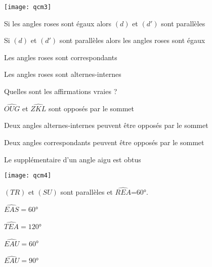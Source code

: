 \begin{QCM}

\begin{GroupeQCM}

\begin{exercice}
\begin{center}
    \texttt{[image: qcm3]}
\end{center}
\begin{ChoixQCM}{4}
\item Si les angles roses sont égaux alors $(d)$ et $(d')$ sont parallèles
\item Si $(d)$ et $(d')$ sont parallèles alors les angles roses sont égaux
\item Les angles roses sont correspondants
\item Les angles roses sont alternes-internes
\end{ChoixQCM}
\begin{corrige}
\end{corrige}
\end{exercice}



\begin{exercice}
Quelles sont les affirmations vraies ?
\begin{ChoixQCM}{4}
\item $\widehat{OUG}$ et $\widehat{ZKL}$ sont opposés par le sommet
\item Deux angles alternes-internes peuvent être opposés par le sommet
\item Deux angles correspondants peuvent être opposés par le sommet
\item Le supplémentaire d'un angle aigu est obtus
\end{ChoixQCM}
\begin{corrige}
\end{corrige}
\end{exercice}




\begin{exercice}
\begin{center}
    \texttt{[image: qcm4]}
    
    $(TR)$ et $(SU)$ sont parallèles et $\widehat{REA}$=60°.
\end{center}
\begin{ChoixQCM}{4}
\item $\widehat{EAS}=60$°
\item $\widehat{TEA}=120$°
\item $\widehat{EAU}=60$°
\item $\widehat{EAU}=90$°
\end{ChoixQCM}
\begin{corrige}
\end{corrige}
\end{exercice}

\end{GroupeQCM}
\end{QCM}